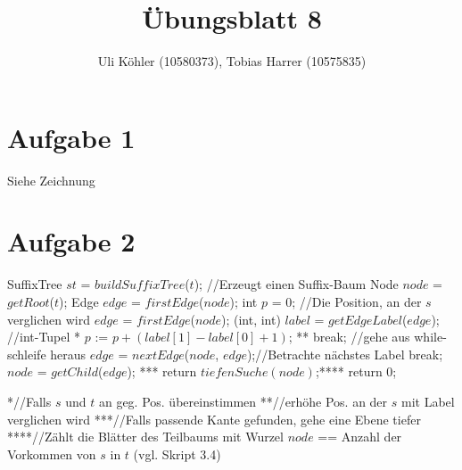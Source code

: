 \documentclass[a4paper,10pt,oneside,leqno]{scrartcl}
\title{Übungsblatt 8}
\author{Uli Köhler (10580373), Tobias Harrer (10575835)}
\begin{document}
\maketitle
\section*{Aufgabe 1}
Siehe Zeichnung
\section*{Aufgabe 2}
\begin{algorithmic}
  \State SuffixTree $st$ = $buildSuffixTree$($t$); //Erzeugt einen Suffix-Baum
  \State Node $node$ = $getRoot$($t$);
  \State Edge $edge$ = $firstEdge$($node$);
  \State int $p$ = 0; //Die Position, an der $s$ verglichen wird
    \State $edge$ = $firstEdge$($node$);
      \State (int, int) $label$ = $getEdgeLabel$($edge$); //int-Tupel
       *
	\State $p$ := $p+(label[1]-label[0]+1)$; **
	\State break; //gehe aus while-schleife heraus
      \EndIf
      \State $edge$ = $nextEdge$($node$, $edge$);//Betrachte nächstes Label
    \EndWhile
    \State break;
    \Else
    \State $node$ = $getChild$($edge$); ***
    \EndIf
  \EndWhile
    \State return $tiefenSuche(node)$;****
  \Else
    \State return 0;
  \EndIf
 \EndFunction
\end{algorithmic}
*//Falls $s$ und $t$ an geg. Pos. übereinstimmen\newline
**//erhöhe Pos. an der $s$ mit Label verglichen wird\newline
***//Falls passende Kante gefunden, gehe eine Ebene tiefer\newline
****//Zählt die Blätter des Teilbaums mit Wurzel $node$ == Anzahl der Vorkommen von $s$ in $t$ (vgl. Skript 3.4)\newline
\end{document}
